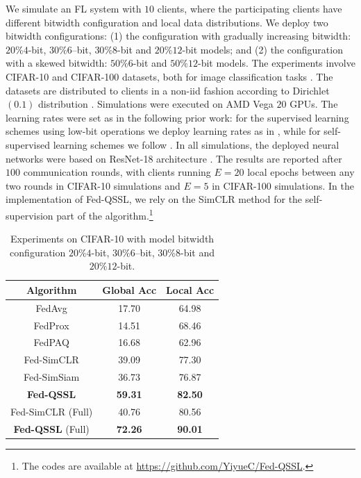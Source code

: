 

We simulate an FL system with $10$ clients, where the participating clients have different bitwidth configuration and local data distributions. We deploy two bitwidth configurations: (1) the configuration with gradually increasing bitwidth: $20\% 4$-bit, $30\% 6$--bit, $30\% 8$-bit and $20\% 12$-bit models; and (2) the configuration with a skewed bitwidth: $50\% 6$-bit and $50\% 12$-bit models. The experiments involve CIFAR-10 and CIFAR-100 datasets, both for image classification tasks \cite{krizhevsky2009learning}. The datasets are distributed to clients in a non-iid fashion according to Dirichlet$(0.1)$ distribution \cite{bibikar2022federated}.
Simulations were executed on AMD Vega $20$ GPUs. The learning rates were set as in the following prior work: for the supervised learning schemes using low-bit operations we deploy learning rates as in \cite{zhou2016dorefa}, while for self-supervised learning schemes we follow \cite{wang2022does}.
In all simulations, the deployed neural networks were based on ResNet-18 architecture \cite{he2016deep}.
The results are reported after $100$ communication rounds, with clients running $E = 20$ local epochs between any two rounds in CIFAR-10 simulations and $E = 5$ in CIFAR-100 simulations. In the implementation of Fed-QSSL, we rely on the SimCLR method \cite{chen2020simple} for the self-supervision part of the algorithm.\footnote{The codes are available at \url{https://github.com/YiyueC/Fed-QSSL}.}

\begin{table}[t]
\centering
\begin{tabular}{c|c|c}
    \hline
    Algorithm & Global Acc & Local Acc \\
    \hline
    FedAvg & 17.70 & 64.98  \\
    \hline
    FedProx & 14.51 & 68.46  \\
    \hline
    FedPAQ & 16.68 & 62.96  \\
    \hline
    Fed-SimCLR & 39.09 & 77.30  \\
    \hline
    Fed-SimSiam & 36.73 & 76.87 \\
    \hline
    \textbf{Fed-QSSL} & \textbf{59.31} & \textbf{82.50} \\
    \hline 
    \hline
    Fed-SimCLR (Full) & 40.76 & 80.56 \\
    \hline
    \textbf{Fed-QSSL} (Full) & \textbf{72.26} & \textbf{90.01} \\
    \hline
\end{tabular}
\caption{Experiments on CIFAR-10 with model bitwidth configuration $20\% 4$-bit, $30\% 6$--bit, $30\% 8$-bit and $20\% 12$-bit.}
\label{table-1}
\end{table}

